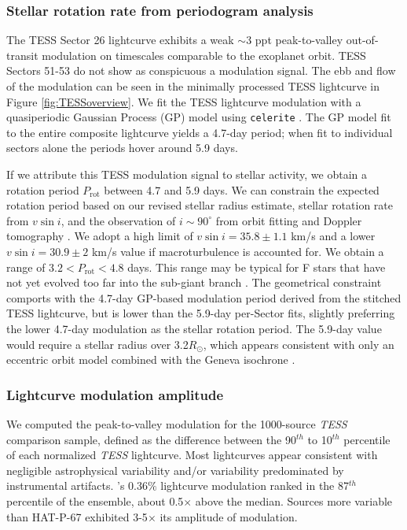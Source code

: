 \documentclass[twocolumn]{aastex631}
\begin{document}
\subsubsection{Stellar rotation rate from periodogram analysis}\label{TESSmodulation}

The TESS Sector 26 lightcurve exhibits a weak $\sim$3 ppt peak-to-valley out-of-transit modulation on timescales comparable to the exoplanet orbit. TESS Sectors 51-53 do not show as conspicuous a modulation signal.  The ebb and flow of the modulation can be seen in the minimally processed TESS lightcurve in Figure \ref{fig:TESSoverview}.  We fit the TESS lightcurve modulation with a quasiperiodic Gaussian Process (GP) model using \texttt{celerite} \citep{celerite1,celerite2}.  The GP model fit to the entire composite lightcurve yields a 4.7-day period; when fit to individual sectors alone the periods hover around 5.9 days.

If we attribute this TESS modulation signal to stellar activity, we obtain a rotation period $P_\mathrm{rot}$ between 4.7 and 5.9 days.  We can constrain the expected rotation period based on our revised stellar radius estimate, stellar rotation rate from $v\sin{i}$, and the observation of $i\sim90^\circ$ from orbit fitting and Doppler tomography \citep{2017AJ....153..211Z}.  We adopt a high limit of $v\sin{i}=35.8\pm1.1$ km/s and a lower $v\sin{i}=30.9\pm2$ km/s value if macroturbulence is accounted for.  We obtain a range of $3.2 < P_\mathrm{rot}  < 4.8 $ days.  This range may be typical for F stars that have not yet evolved too far into the sub-giant branch \citep{2022ApJ...930....7A}.  The geometrical constraint comports with the 4.7-day GP-based modulation period derived from the stitched TESS lightcurve, but is lower than the 5.9-day per-Sector fits, slightly preferring the lower 4.7-day modulation as the stellar rotation period.  The 5.9-day value would require a stellar radius over 3.2$R_\odot$, which appears consistent with only an eccentric orbit model combined with the Geneva isochrone \citep{2017AJ....153..211Z}.


\subsubsection{Lightcurve modulation amplitude}
We computed the peak-to-valley modulation for the 1000-source \emph{TESS} comparison sample, defined as the difference between the 90$^{th}$ to 10$^{th}$ percentile of each normalized \emph{TESS} lightcurve.  Most lightcurves appear consistent with negligible astrophysical variability and/or variability predominated by instrumental artifacts. 's 0.36$\%$ lightcurve modulation ranked in the 87$^{th}$ percentile of the ensemble, about 0.5$\times$ above the median.  Sources more variable than HAT-P-67 exhibited 3-5$\times$ its amplitude of modulation.
\end{document}
